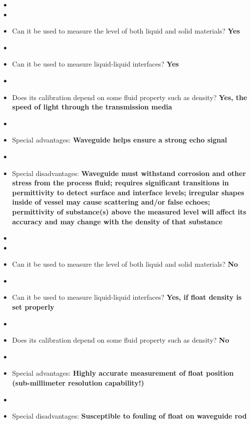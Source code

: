 \vskip 10pt

\begin{itemize}
\goodbreak
\item{} 
\item\item{} Can it be used to measure the level of both liquid and solid materials? {\bf Yes}
\item\item{} Can it be used to measure liquid-liquid interfaces? {\bf Yes}
\item\item{} Does its calibration depend on some fluid property such as density? {\bf Yes, the speed of light through the transmission media}
\item\item{} Special advantages: {\bf Waveguide helps ensure a strong echo signal}
\item\item{} Special disadvantages: {\bf Waveguide must withstand corrosion and other stress from the process fluid; requires significant transitions in permittivity to detect surface and interface levels; irregular shapes inside of vessel may cause scattering and/or false echoes; permittivity of substance(s) above the measured level will affect its accuracy and may change with the density of that substance}
\end{itemize}

\vskip 10pt

\begin{itemize}
\goodbreak
\item{} 
\item\item{} Can it be used to measure the level of both liquid and solid materials? {\bf No}
\item\item{} Can it be used to measure liquid-liquid interfaces? {\bf Yes, if float density is set properly}
\item\item{} Does its calibration depend on some fluid property such as density? {\bf No}
\item\item{} Special advantages: {\bf Highly accurate measurement of float position (sub-millimeter resolution capability!)}
\item\item{} Special disadvantages: {\bf Susceptible to fouling of float on waveguide rod}
\end{itemize}

